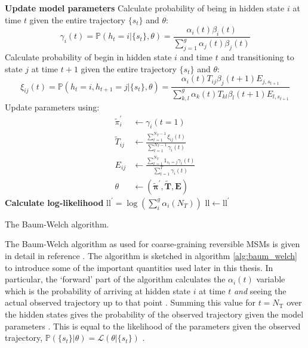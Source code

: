 \begin{algorithm}
{{    \textbf{Update model parameters}\;
    Calculate probability of being in hidden state $i$ at time $t$ given the entire trajectory $\{s_{t}\}$ and  $\theta$:\;
    \begin{equation*}
    \gamma_{i}(t) = \mathbb{P}(h_t=i|\{s_t\}, \theta) = \frac{\alpha_{i}(t) \beta_{i}(t)}{\sum_{j=1}^{g} \alpha_{j}(t) \beta_{j}(t)}
    \end{equation*}
    Calculate probability of begin in hidden state $i$ and time $t$ and transitioning to state $j$ at time $t+1$ given the entire trajectory $\{s_{t}\}$ and  $\theta$:\;
    \begin{equation*}
        \xi_{ij}(t) = \mathbb{P}(h_t=i, h_{t+1} = j|\{s_t\}, \theta) = \frac{\alpha_{i}(t)T_{ij}\beta_{j}(t+1)E_{j, s_{t+1}}}{\sum_{k, l}^{g}\alpha_{k}(t)T_{kl}\beta_{l}(t+1)E_{l, s_{t+1}}}
    \end{equation*}
    Update parameters using:
    \begin{align*}
        \widetilde{\pi}_{i}^{\prime}  &\longleftarrow \gamma_{i}(t=1) \\
        \widetilde{T}_{ij} & \longleftarrow \frac{\sum_{t=1}^{N_{T}-1} \xi_{i j}(t)}{\sum_{t=1}^{N_{T}-1} \gamma_{i}(t)} \\
        E_{ij} & \longleftarrow \frac{\sum_{t=1}^{N_{T}} 1_{s_{t}=j} \gamma_{i}(t)}{\sum_{t=1}^{T} \gamma_{i}(t)} \\
        \theta & \longleftarrow (\widetilde{\bm{\pi}}^{\prime}, \widetilde{\mathbf{T}}, \mathbf{E})
    \end{align*}
    \textbf{Calculate log-likelihood}\;
    $\mathrm{ll}^{\prime} = \log{\left(\sum_{i}^{g}\alpha_{i}(N_{T})\right)}$\;
    $\mathrm{ll} \longleftarrow \mathrm{ll}^{\prime}$\;
}
}
\caption{The Baum-Welch algorithm.\label{alg:baum_welch}}
\end{algorithm}

The Baum-Welch algorithm as used for coarse-graining reversible MSMs is given in detail in reference \cite{noeProjectedHiddenMarkov2013a}. The algorithm is sketched in algorithm \ref{alg:baum_welch} to introduce some of the important quantities used later in this thesis. In particular, the `forward' part of the algorithm calculates the $\alpha_{i}(t)$ variable which is the probability of arriving at hidden state $i$ at time $t$ \emph{and} seeing the actual observed trajectory up to that point \cite{rabinerTutorialHiddenMarkov1989}. Summing this value for $t=N_{\mathrm{T}}$ over the hidden states gives the probability of the observed trajectory given the model parameters \cite{rabinerTutorialHiddenMarkov1989}. This is equal to the likelihood of the parameters given the observed trajectory, $\mathbb{P}(\{s_{t}\}|\theta)=\mathcal{L}(\theta|\{s_{t}\})$ \cite{rabinerTutorialHiddenMarkov1989}. 

